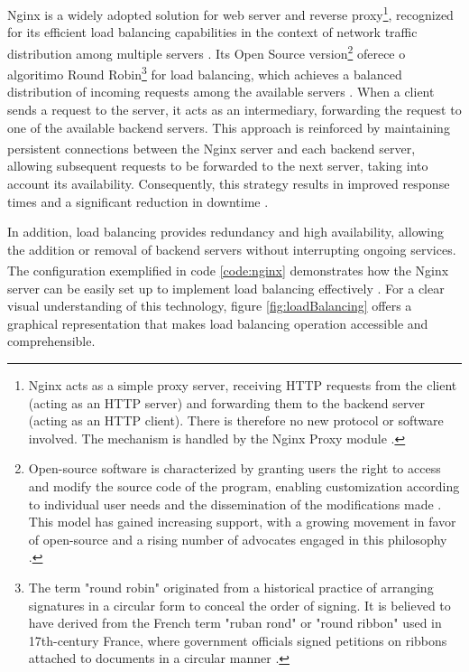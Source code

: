 Nginx\textsuperscript{\textregistered} is a widely adopted solution for web server and reverse proxy\footnote{Nginx acts as a simple proxy server, receiving HTTP requests from the client (acting as an HTTP server) and forwarding them to the backend server (acting as an HTTP client). There is therefore no new protocol or software involved. The mechanism is handled by the Nginx Proxy module \cite{fjordvald2018nginx}.}, recognized for its efficient load balancing capabilities in the context of network traffic distribution among multiple servers \cite{Chi2012}. Its Open Source version\footnote{Open-source software is characterized by granting users the right to access and modify the source code of the program, enabling customization according to individual user needs and the dissemination of the modifications made \cite{perens1999open}. This model has gained increasing support, with a growing movement in favor of open-source and a rising number of advocates engaged in this philosophy \cite{lerner2002}. } oferece o  algoritimo Round Robin\footnote{The term "round robin" originated from a historical practice of arranging signatures in a circular form to conceal the order of signing. It is believed to have derived from the French term "ruban rond" or "round ribbon" used in 17th-century France, where government officials signed petitions on ribbons attached to documents in a circular manner \cite[p. 716]{Hendrickson2008}.} for load balancing, which achieves a balanced distribution of incoming requests among the available servers \cite{nginxArticle}. When a client sends a request to the server, it acts as an intermediary, forwarding the request to one of the available backend servers. This approach is reinforced by maintaining persistent connections between the Nginx\textsuperscript{\textregistered} server and each backend server, allowing subsequent requests to be forwarded to the next server, taking into account its availability. Consequently, this strategy results in improved response times and a significant reduction in downtime \cite{Chi2012}.

In addition, load balancing provides redundancy and high availability, allowing the addition or removal of backend servers without interrupting ongoing services. The configuration exemplified in code \ref{code:nginx} demonstrates how the Nginx\textsuperscript{\textregistered} server can be easily set up to implement load balancing effectively \cite{nginxArticle}. For a clear visual understanding of this technology, figure \ref{fig:loadBalancing} offers a graphical representation that makes load balancing operation accessible and comprehensible.

